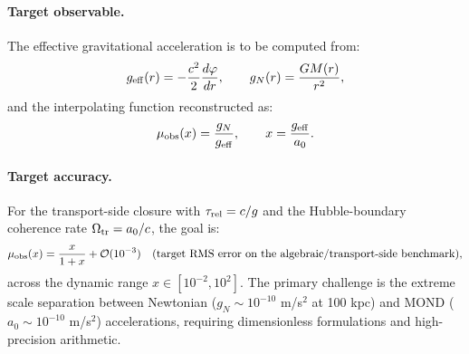 \documentclass[11pt]{article}
\begin{document}
\paragraph{Target observable.}
The effective gravitational acceleration is to be computed from:
\begin{equation}
g_{\rm eff}(r) = -\frac{c^2}{2} \frac{d\varphi}{dr}, \qquad g_N(r) = \frac{GM(r)}{r^2},
\label{eq:extracted_g}
\end{equation}
and the interpolating function reconstructed as:
\begin{equation}
\mu_{\rm obs}(x) = \frac{g_N}{g_{\rm eff}}, \qquad x = \frac{g_{\rm eff}}{a_0}.
\label{eq:mu_obs}
\end{equation}

\paragraph{Target accuracy.}
For the transport-side closure with $\tau_{\rm rel}=c/g$
and the Hubble-boundary coherence rate $\Omega_{\rm tr}=a_0/c$, the goal is:
\begin{equation}
\mu_{\rm obs}(x) = \frac{x}{1+x} + \mathcal{O}(10^{-3}) \quad \text{(target RMS error on the algebraic/transport-side benchmark)},
\label{eq:numerical_prediction}
\end{equation}
across the dynamic range $x \in [10^{-2}, 10^{2}]$. The primary challenge is the extreme scale separation between Newtonian ($g_N \sim 10^{-10}$ m/s$^2$ at 100 kpc) and MOND ($a_0 \sim 10^{-10}$ m/s$^2$) accelerations, requiring dimensionless formulations and high-precision arithmetic.
\end{document}
